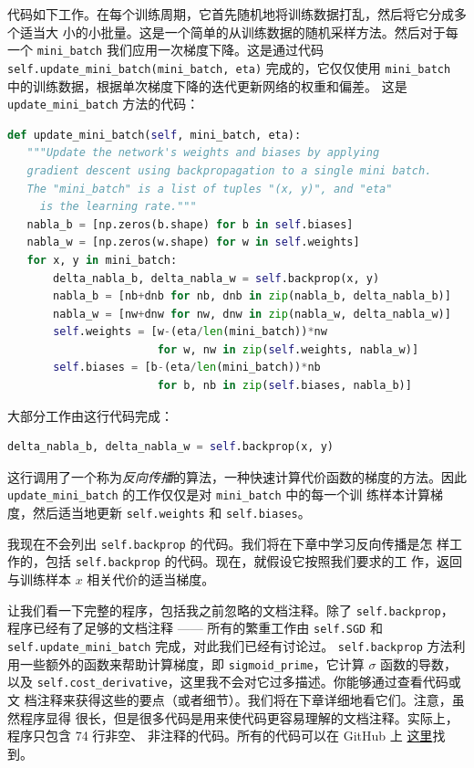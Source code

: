 代码如下工作。在每个训练周期，它首先随机地将训练数据打乱，然后将它分成多个适当大
小的小批量。这是一个简单的从训练数据的随机采样方法。然后对于每一个
\lstinline!mini_batch! 我们应用一次梯度下降。这是通过代码
\lstinline!self.update_mini_batch(mini_batch, eta)! 完成的，它仅仅使用
\lstinline!mini_batch! 中的训练数据，根据单次梯度下降的迭代更新网络的权重和偏差。
这是 \lstinline!update_mini_batch! 方法的代码：
\begin{lstlisting}[language=Python]
def update_mini_batch(self, mini_batch, eta):
   """Update the network's weights and biases by applying
   gradient descent using backpropagation to a single mini batch.
   The "mini_batch" is a list of tuples "(x, y)", and "eta"
     is the learning rate."""
   nabla_b = [np.zeros(b.shape) for b in self.biases]
   nabla_w = [np.zeros(w.shape) for w in self.weights]
   for x, y in mini_batch:
       delta_nabla_b, delta_nabla_w = self.backprop(x, y)
       nabla_b = [nb+dnb for nb, dnb in zip(nabla_b, delta_nabla_b)]
       nabla_w = [nw+dnw for nw, dnw in zip(nabla_w, delta_nabla_w)]
       self.weights = [w-(eta/len(mini_batch))*nw
                       for w, nw in zip(self.weights, nabla_w)]
       self.biases = [b-(eta/len(mini_batch))*nb
                       for b, nb in zip(self.biases, nabla_b)]
\end{lstlisting}

大部分工作由这行代码完成：
\begin{lstlisting}[language=Python]
     delta_nabla_b, delta_nabla_w = self.backprop(x, y)
\end{lstlisting}

这行调用了一个称为\emph{反向传播}的算法，一种快速计算代价函数的梯度的方法。因此
\lstinline!update_mini_batch! 的工作仅仅是对 \lstinline!mini_batch! 中的每一个训
练样本计算梯度，然后适当地更新 \lstinline!self.weights! 和
\lstinline!self.biases!。

我现在不会列出 \lstinline!self.backprop! 的代码。我们将在下章中学习反向传播是怎
样工作的，包括 \lstinline!self.backprop! 的代码。现在，就假设它按照我们要求的工
作，返回与训练样本 $x$ 相关代价的适当梯度。

让我们看一下完整的程序，包括我之前忽略的文档注释。除了 \lstinline!self.backprop!，
程序已经有了足够的文档注释 —— 所有的繁重工作由 \lstinline!self.SGD! 和
\lstinline!self.update_mini_batch! 完成，对此我们已经有讨论过。
\lstinline!self.backprop! 方法利用一些额外的函数来帮助计算梯度，即
\lstinline!sigmoid_prime!，它计算 $\sigma$ 函数的导数，以及
\lstinline!self.cost_derivative!，这里我不会对它过多描述。你能够通过查看代码或文
档注释来获得这些的要点（或者细节）。我们将在下章详细地看它们。注意，虽然程序显得
很长，但是很多代码是用来使代码更容易理解的文档注释。实际上，程序只包含 74 行非空、
非注释的代码。所有的代码可以在 GitHub 上%
\href{https://github.com/mnielsen/neural-networks-and-deep-learning/blob/master/src/network.py}{
  这里}找到。

